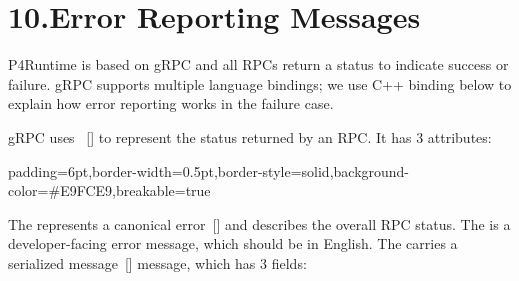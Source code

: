\documentclass[11pt]{article}
\begin{document}
{%
\section{10.\hspace*{0.5em}Error Reporting Messages}\label{sec-error-reporting-messages}%

\noindent{}P4Runtime is based on gRPC and all RPCs return a status to indicate success or
failure. gRPC supports multiple language bindings; we use C++ binding below to
explain how error reporting works in the failure case.%

gRPC uses ~[] to represent the status returned by an
RPC. It has 3 attributes:%

\begin{mdbmargintb}{6pt}{6pt}%
\begin{mdblock}{padding=6pt,border-width=0.5pt,border-style=solid,background-color=\#E9FCE9,breakable=true}%
\begin{mdpre}%
\end{mdpre}%
\end{mdblock}%
\end{mdbmargintb}%

\noindent{}The  represents a canonical error~[] and describes the
overall RPC status. The  is a developer-facing error message,
which should be in English. The  carries a serialized
 message~[] message, which has 3 fields:%

}
\end{document}
